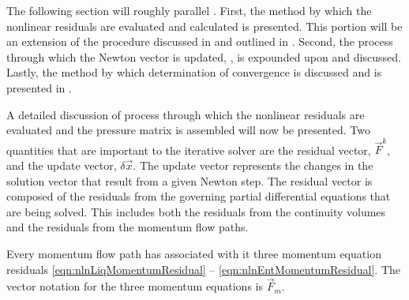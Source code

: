 The following section will roughly parallel .
First, the method by which the nonlinear residuals are evaluated and calculated is presented.
This portion will be an extension of the procedure discussed in  and outlined in .
Second, the process through which the Newton vector is updated, , is expounded upon and  discussed.
Lastly, the method by which determination of convergence is discussed and is presented in .

A detailed discussion of process through which the nonlinear residuals are evaluated and the pressure matrix is assembled will now be presented.
Two quantities that are important to the iterative solver are the residual vector, $\vec{F}^{k}$, and the update vector, $\delta \vec{x}$.
The update vector represents the changes in the solution vector that result from a given Newton step.
The residual vector is composed of the residuals from the governing partial differential equations that are being solved.
This includes both the residuals from the continuity volumes and the residuals from the momentum flow paths.

Every momentum flow path has associated with it three momentum equation residuals \eqref{eqn:nlnLiqMomentumResidual} -- \eqref{eqn:nlnEntMomentumResidual}.
The vector notation for the three momentum equations is $\vec{F}_{m}$.

